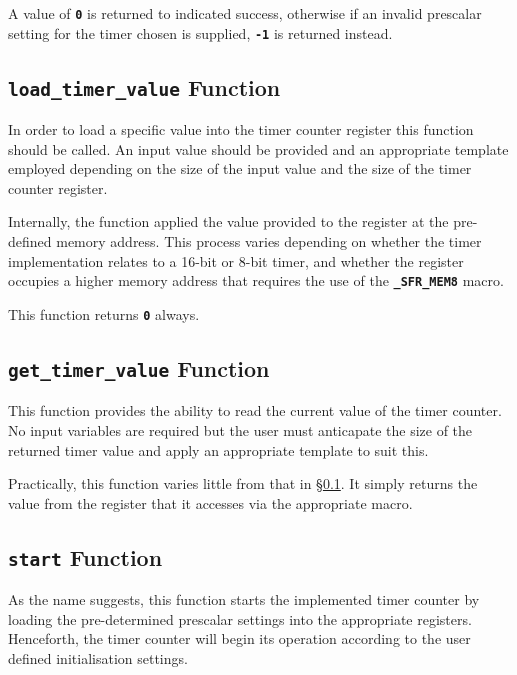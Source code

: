 \documentclass[a4paper, oneside, 11pt, titlepage, onecolumn, openright]{report}
\begin{document}
			A value of \textbf{\texttt{0}} is returned to indicated success, otherwise if an invalid prescalar setting for the timer chosen is supplied, \textbf{\texttt{-1}} is returned instead.
			
\subsection{\textbf{\texttt{load\_timer\_value}} Function}
			\label{ss:HALtcload_timer_valueFunction}
			
			In order to load a specific value into the timer counter register this function should be called. An input value should be provided and an appropriate template employed depending on the size of the input value and the size of the timer counter register.
			
			Internally, the function applied the value provided to the register at the pre-defined memory address. This process varies depending on whether the timer implementation relates to a 16-bit or 8-bit timer, and whether the register occupies a higher memory address that requires the use of the \textbf{\texttt{\_SFR\_MEM8}} macro.
			
			This function returns \textbf{\texttt{0}} always.
			
\subsection{\textbf{\texttt{get\_timer\_value}} Function}
			\label{ss:HALtcget_timer_valueFunction}
			
			This function provides the ability to read the current value of the timer counter. No input variables are required but the user must anticapate the size of the returned timer value and apply an appropriate template to suit this.
			
			Practically, this function varies little from that in \S\ref{ss:HALtcload_timer_valueFunction}. It simply returns the value from the register that it accesses via the appropriate macro.
			
\subsection{\textbf{\texttt{start}} Function}
			\label{ss:HALtcstartFunction}
			
			As the name suggests, this function starts the implemented timer counter by loading the pre-determined prescalar settings into the appropriate registers. Henceforth, the timer counter will begin its operation according to the user defined initialisation settings.
			
\end{document}
